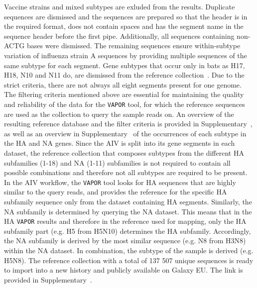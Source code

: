 Vaccine strains and mixed subtypes are exluded from the results. Duplicate sequences are dismissed and the sequences are prepared so that the header is in the required format, does not contain spaces and has the segment name in the sequence header before the first pipe. Additionally, all sequences containing non-ACTG bases were dismissed. The remaining sequences ensure within-subtype variation of influenza strain A sequences by providing multiple sequences of the same subtype for each segment. Gene subtypes that occur only in bats as H17, H18, N10 and N11 do, are dismissed from the reference collection~. Due to the strict criteria, there are not always all eight segments present for one genome. The filtering criteria mentioned above are essential for maintaining the quality and reliability of the data for the \texttt{VAPOR} tool, for which the reference sequences are used as the collection to query the sample reads on. An overview of the resulting reference database and the filter criteria is provided in Supplementary~, as well as an overview in Supplementary~ of the occurrences of each subtype in the \ac{HA} and \ac{NA} genes. Since the \ac{AIV} is split into its gene segments in each dataset, the reference collection that composes subtypes from the different \ac{HA} subfamilies (1-18) and \ac{NA} (1-11) subfamilies is not required to contain all possible combinations and therefore not all subtypes are required to be present. In the \ac{AIV} workflow, the \texttt{VAPOR} tool looks for \ac{HA} sequences that are highly similar to the query reads, and provides the reference for the specific \ac{HA} subfamily sequence only from the dataset containing \ac{HA} segments. Similarly, the \ac{NA} subfamily is determined by querying the \ac{NA} dataset. This means that in the \ac{HA} \texttt{VAPOR} results and therefore in the reference used for mapping, only the \ac{HA} subfamily part (e.g. H5 from H5N10) determines the \ac{HA} subfamily. Accordingly, the \ac{NA} subfamily is derived by the most similar sequence (e.g. N8 from H3N8) within the \ac{NA} dataset. In combination, the subtype of the sample is derived (e.g. H5N8).
The reference collection with a total of 137 507 unique sequences is ready to import into a new history and publicly available on Galaxy EU. The link is provided in Supplementary~. 

